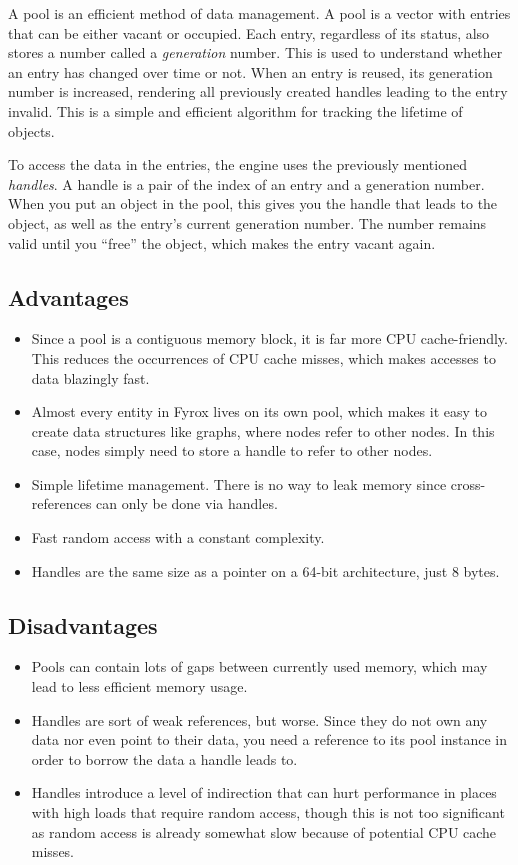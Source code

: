 \documentclass[
]{book}
\providecommand{\tightlist}{%
  \setlength{\itemsep}{0pt}\setlength{\parskip}{0pt}}
\theoremstyle{definition}
\theoremstyle{definition}
\theoremstyle{definition}
\theoremstyle{definition}
\theoremstyle{remark}
\begin{document}
A pool is an efficient method of data management. A pool is a vector with entries that can be either vacant or occupied. Each entry, regardless of its status, also stores a number called a \emph{generation} number. This is used to understand whether an entry has changed over time or not. When an entry is reused, its generation number is increased, rendering all previously created handles leading to the entry invalid. This is a simple and efficient algorithm for tracking the lifetime of objects.

To access the data in the entries, the engine uses the previously mentioned \emph{handles}. A handle is a pair of the index of an entry
and a generation number. When you put an object in the pool, this gives you the handle that leads to the object, as well as the
entry's current generation number. The number remains valid until you ``free'' the object, which makes the entry vacant again.

\subsection{Advantages}\label{advantages}

\begin{itemize}
\tightlist
\item
  Since a pool is a contiguous memory block, it is far more CPU cache-friendly. This reduces the occurrences of CPU cache misses, which makes accesses to data blazingly fast.
\item
  Almost every entity in Fyrox lives on its own pool, which makes it easy to create data structures
  like graphs, where nodes refer to other nodes. In this case, nodes simply need to store a handle to refer to other nodes.
\item
  Simple lifetime management. There is no way to leak memory since cross-references can only be done via handles.
\item
  Fast random access with a constant complexity.
\item
  Handles are the same size as a pointer on a 64-bit architecture, just 8 bytes.
\end{itemize}

\subsection{Disadvantages}\label{disadvantages}

\begin{itemize}
\tightlist
\item
  Pools can contain lots of gaps between currently used memory, which may lead to less efficient memory usage.
\item
  Handles are sort of weak references, but worse. Since they do not own any data nor even point to their data, you need a reference to its pool instance in order to borrow the data a handle leads to.
\item
  Handles introduce a level of indirection that can hurt performance in places with high loads that require random access, though this is not too significant as random access is already somewhat slow because of potential CPU cache misses.
\end{itemize}
\end{document}
